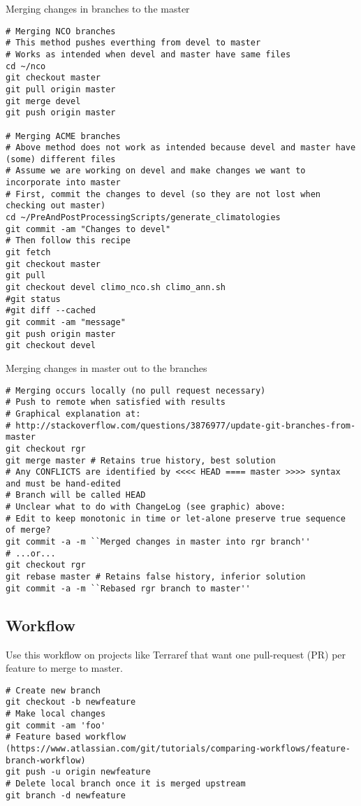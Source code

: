 \documentclass[12pt,twoside]{article}
\begin{document}
Merging changes in branches to the master
\begin{verbatim}
# Merging NCO branches
# This method pushes everthing from devel to master
# Works as intended when devel and master have same files
cd ~/nco
git checkout master
git pull origin master
git merge devel
git push origin master

# Merging ACME branches
# Above method does not work as intended because devel and master have (some) different files
# Assume we are working on devel and make changes we want to incorporate into master
# First, commit the changes to devel (so they are not lost when checking out master)
cd ~/PreAndPostProcessingScripts/generate_climatologies
git commit -am "Changes to devel"
# Then follow this recipe
git fetch
git checkout master
git pull
git checkout devel climo_nco.sh climo_ann.sh
#git status
#git diff --cached
git commit -am "message"
git push origin master
git checkout devel
\end{verbatim}

Merging changes in master out to the branches
\begin{verbatim}
# Merging occurs locally (no pull request necessary)
# Push to remote when satisfied with results
# Graphical explanation at:
# http://stackoverflow.com/questions/3876977/update-git-branches-from-master
git checkout rgr
git merge master # Retains true history, best solution
# Any CONFLICTS are identified by <<<< HEAD ==== master >>>> syntax and must be hand-edited
# Branch will be called HEAD
# Unclear what to do with ChangeLog (see graphic) above:
# Edit to keep monotonic in time or let-alone preserve true sequence of merge?
git commit -a -m ``Merged changes in master into rgr branch''
# ...or...
git checkout rgr
git rebase master # Retains false history, inferior solution
git commit -a -m ``Rebased rgr branch to master''
\end{verbatim}

\subsection{Workflow}\label{sxn:git_wrk}
Use this workflow on projects like Terraref that want one pull-request
(PR) per feature to merge to master. 
\begin{verbatim}
# Create new branch
git checkout -b newfeature
# Make local changes
git commit -am 'foo'
# Feature based workflow (https://www.atlassian.com/git/tutorials/comparing-workflows/feature-branch-workflow)
git push -u origin newfeature
# Delete local branch once it is merged upstream
git branch -d newfeature
\end{verbatim}
\end{document}
